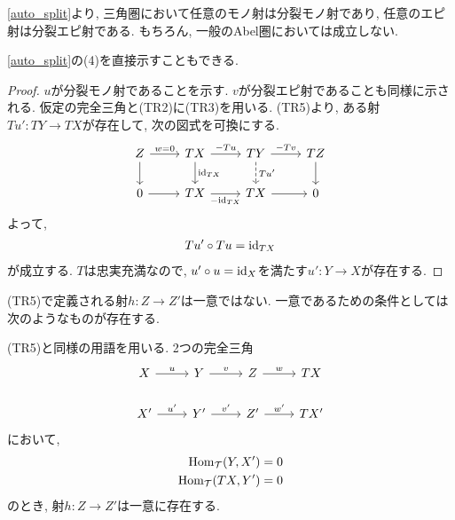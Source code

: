 \documentclass[uplatex, a4paper, 14Q, dvipdfmx]{jsarticle}
\begin{document}
\begin{remark}
  \cref{auto_split}より, 三角圏において任意のモノ射は分裂モノ射であり, 任意のエピ射は分裂エピ射である. 
  もちろん, 一般のAbel圏においては成立しない. 
\end{remark}

\begin{remark}
  \cref{auto_split}の(4)を直接示すこともできる. 
\end{remark}

\begin{proof}
  $u$が分裂モノ射であることを示す.
  $v$が分裂エピ射であることも同様に示される. 
  仮定の完全三角と(TR2)に(TR3)を用いる. 
  (TR5)より, ある射$Tu': TY \to TX$が存在して, 次の図式を可換にする. 
  \[\begin{tikzcd}
    Z & TX & TY & TZ \\
    0 & TX & TX & 0
    \arrow["{w=0}", from=1-1, to=1-2]
    \arrow["{-Tu}", from=1-2, to=1-3]
    \arrow["{-Tv}", from=1-3, to=1-4]
    \arrow[from=1-4, to=2-4]
    \arrow["{Tu'}", dashed, from=1-3, to=2-3]
    \arrow["{\id_{TX}}", from=1-2, to=2-2]
    \arrow[from=1-1, to=2-1]
    \arrow[from=2-1, to=2-2]
    \arrow["{-\id_{TX}}"', from=2-2, to=2-3]
    \arrow[from=2-3, to=2-4]
  \end{tikzcd}\]
  よって, 
  \begin{align*}
    Tu' \circ Tu = \mathrm{id}_{TX}
  \end{align*}
  が成立する. 
  $T$は忠実充満なので, $u' \circ u = \mathrm{id}_X$を満たす$u': Y \to X$が存在する. 
\end{proof}

(TR5)で定義される射$h : Z \to Z'$は一意ではない.
一意であるための条件としては次のようなものが存在する. 

\begin{lemma}
  (TR5)と同様の用語を用いる. 
  2つの完全三角
  \[\begin{tikzcd}
    X & Y & Z & TX \\
    {X'} & {Y'} & {Z'} & {TX'}
    \arrow["u", from=1-1, to=1-2]
    \arrow["v", from=1-2, to=1-3]
    \arrow["w", from=1-3, to=1-4]
    \arrow["{u'}", from=2-1, to=2-2]
    \arrow["{v'}", from=2-2, to=2-3]
    \arrow["{w'}", from=2-3, to=2-4]
  \end{tikzcd}\]
  において, 
  \begin{align*}
    \mathrm{Hom}_{\mathcal{T}}(Y,X') &= 0 \\
    \mathrm{Hom}_{\mathcal{T}}(TX,Y') &= 0
  \end{align*}
  のとき, 射$h : Z \to Z'$は一意に存在する. 
\end{lemma}
\end{document}
